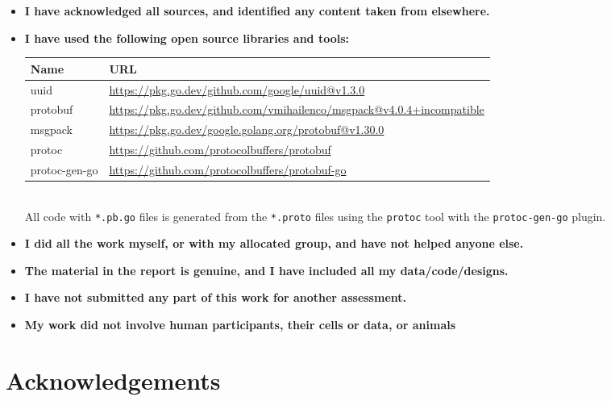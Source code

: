 \documentclass[12pt]{report}
\begin{document}
\begin{itemize}
    \item \textbf{I have acknowledged all sources, and identified any content taken from elsewhere.}
    \item \textbf{I have used the following open source libraries and tools:}\\[-0.8cm]
    \begin{table}[h]
        \centering
        \begin{tabularx}{\textwidth}{|l|X|}
        \hline
        \textbf{Name} & \textbf{URL} \\ \hline
        uuid     &  \scriptsize{\url{https://pkg.go.dev/github.com/google/uuid@v1.3.0}}  \\ 
        protobuf     &   \scriptsize{\url{https://pkg.go.dev/github.com/vmihailenco/msgpack@v4.0.4+incompatible}}  \\
        msgpack     &    \scriptsize{\url{https://pkg.go.dev/google.golang.org/protobuf@v1.30.0}} \\ 
        protoc    &    \scriptsize{\url{https://github.com/protocolbuffers/protobuf}} \\
        protoc-gen-go   &    \scriptsize{\url{https://github.com/protocolbuffers/protobuf-go}} \\ 
        \hline
        \end{tabularx}
    \end{table}
    \\[-.4cm]All code with \texttt{*.pb.go} files is generated from the \texttt{*.proto} files using the \texttt{protoc} tool with the \texttt{protoc-gen-go} plugin.
    \item \textbf{I did all the work myself, or with my allocated group, and have not helped anyone else.}
    \item \textbf{The material in the report is genuine, and I have included all my data/code/designs.}
    \item \textbf{I have not submitted any part of this work for another assessment.}
    \item \textbf{My work did not involve human participants, their cells or data, or animals}
\end{itemize}

\newpage
\chapter*{Acknowledgements}
\end{document}
